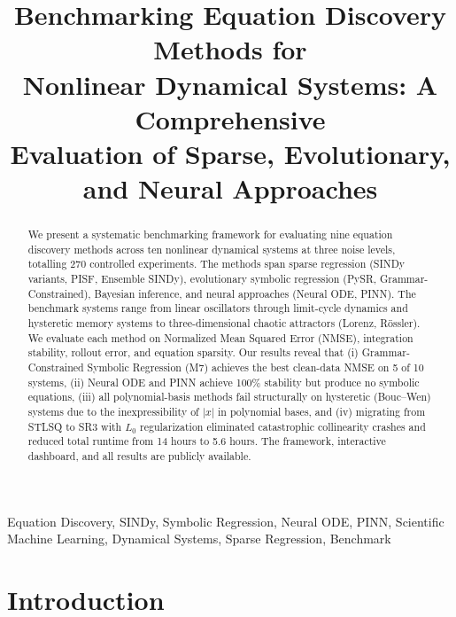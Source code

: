 \documentclass[conference]{IEEEtran}
\begin{document}
\title{Benchmarking Equation Discovery Methods for\\Nonlinear Dynamical Systems: A Comprehensive\\Evaluation of Sparse, Evolutionary, and Neural Approaches}

\author{
}

\maketitle

\begin{abstract}
We present a systematic benchmarking framework for evaluating nine equation discovery methods across ten nonlinear dynamical systems at three noise levels, totalling 270 controlled experiments. The methods span sparse regression (SINDy variants, PISF, Ensemble SINDy), evolutionary symbolic regression (PySR, Grammar-Constrained), Bayesian inference, and neural approaches (Neural ODE, PINN). The benchmark systems range from linear oscillators through limit-cycle dynamics and hysteretic memory systems to three-dimensional chaotic attractors (Lorenz, R\"{o}ssler). We evaluate each method on Normalized Mean Squared Error (NMSE), integration stability, rollout error, and equation sparsity. Our results reveal that (i) Grammar-Constrained Symbolic Regression (M7) achieves the best clean-data NMSE on 5 of 10 systems, (ii) Neural ODE and PINN achieve 100\% stability but produce no symbolic equations, (iii) all polynomial-basis methods fail structurally on hysteretic (Bouc--Wen) systems due to the inexpressibility of $|x|$ in polynomial bases, and (iv) migrating from STLSQ to SR3 with $L_0$ regularization eliminated catastrophic collinearity crashes and reduced total runtime from 14 hours to 5.6 hours. The framework, interactive dashboard, and all results are publicly available.
\end{abstract}

\begin{IEEEkeywords}
Equation Discovery, SINDy, Symbolic Regression, Neural ODE, PINN, Scientific Machine Learning, Dynamical Systems, Sparse Regression, Benchmark
\end{IEEEkeywords}

\section{Introduction}
\label{sec:intro}
\end{document}
